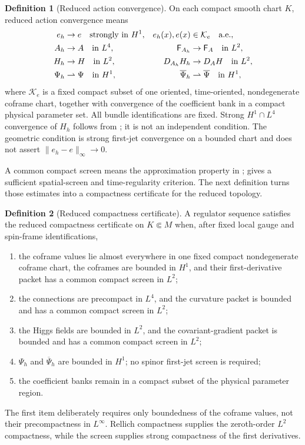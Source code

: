 \documentclass[11pt]{article}
\numberwithin{equation}{section}
\theoremstyle{definition}
\newtheorem{definition}[definition]{Definition}
\theoremstyle{remark}
\newcommand{\norm}[1]{\lVert#1\rVert}
\newcommand{\Fcurv}{\mathsf F}
\newcommand{\bPsi}{\overline\Psi}
\begin{document}
\begin{definition}[Reduced action convergence]
\label{def:reduced-topology}
On each compact smooth chart $K$, reduced action convergence means
\begin{align}
 e_h&\to e\quad\text{strongly in }H^1,
 &e_h(x),e(x)&\in\mathcal K_e\quad\text{a.e.},\notag\\
 A_h&\to A\quad\text{in }L^4,
 &\Fcurv_{A_h}&\to\Fcurv_A\quad\text{in }L^2,\notag\\
 H_h&\to H\quad\text{in }L^2,
 &D_{A_h}H_h&\to D_AH\quad\text{in }L^2,\notag\\
 \Psi_h&\rightharpoonup\Psi\quad\text{in }H^1,
 &\bPsi_h&\rightharpoonup\bPsi\quad\text{in }H^1,
 \label{eq:reduced-topology}
\end{align}
where $\mathcal K_e$ is a fixed compact subset of one oriented,
time-oriented, nondegenerate coframe chart, together with convergence of the
coefficient bank in a compact physical parameter set.  All bundle
identifications are fixed.  Strong $H^1\cap L^4$ convergence of $H_h$
follows from ; it is not an independent
condition.  The geometric condition is strong first-jet convergence on a
bounded chart and does not assert $\norm{e_h-e}_\infty\to0$.
\end{definition}

A common compact screen means the approximation property in
;  gives a sufficient
spatial-screen and time-regularity criterion. The next definition turns
those estimates into a compactness certificate for the reduced topology.

\begin{definition}[Reduced compactness certificate]
\label{def:reduced-certificate}
A regulator sequence satisfies the reduced compactness certificate on
$K\Subset M$ when, after fixed local gauge and spin-frame identifications,
\begin{enumerate}[label=\textup{(R\arabic*)},leftmargin=3.2em]
\item the coframe values lie almost everywhere in one fixed compact
      nondegenerate coframe chart, the coframes are bounded in $H^1$, and
      their first-derivative packet has a common compact screen in $L^2$;
\item the connections are precompact in $L^4$, and the curvature packet is
      bounded and has a common compact screen in $L^2$;
\item the Higgs fields are bounded in $L^2$, and the covariant-gradient
      packet is bounded and has a common compact screen in $L^2$;
\item $\Psi_h$ and $\bPsi_h$ are bounded in $H^1$; no spinor first-jet
      screen is required;
\item the coefficient banks remain in a compact subset of the physical
      parameter region.
\end{enumerate}
The first item deliberately requires only boundedness of the coframe values,
not their precompactness in $L^\infty$.  Rellich compactness supplies the
zeroth-order $L^2$ compactness, while the screen supplies strong compactness
of the first derivatives.
\end{definition}
\end{document}
